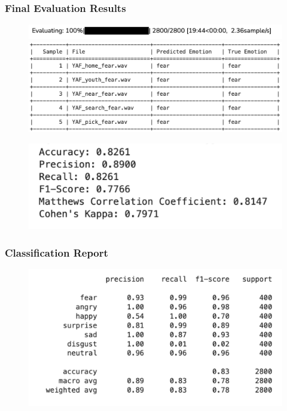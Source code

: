 \documentclass[a4paper,12pt]{article}
\begin{document}
\subsubsection{Final Evaluation Results}
\begin{figure}[H]
    \centering
    \includegraphics[width=1\linewidth]{FinalResults1.png}
    \includegraphics[width=1\linewidth]{FinalResults2.png}
\end{figure}
\begin{figure}[H]
    \centering
    \includegraphics[width=1\linewidth]{FinalResults3.png}
\end{figure}
\subsubsection{Classification Report}
\begin{figure}[H]
    \centering
    \includegraphics[width=1\linewidth]{FinalResults5.png}
\end{figure}
\end{document}
